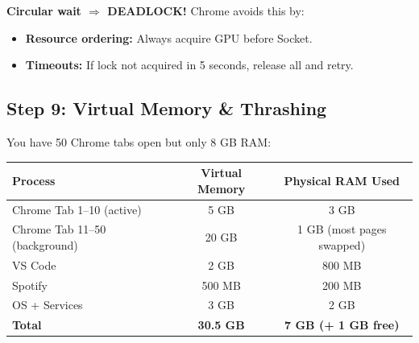 \documentclass[12pt,a4paper]{article}
\begin{document}
\begin{center}
\end{center}

\textbf{Circular wait $\Rightarrow$ DEADLOCK!} Chrome avoids this by:
\begin{itemize}[leftmargin=*]
    \item \textbf{Resource ordering:} Always acquire GPU before Socket.
    \item \textbf{Timeouts:} If lock not acquired in 5 seconds, release all and retry.
\end{itemize}

\subsection{Step 9: Virtual Memory \& Thrashing}

You have 50 Chrome tabs open but only 8 GB RAM:

\begin{center}
\begin{tabular}{@{} l c c @{}}
\toprule
\textbf{Process} & \textbf{Virtual Memory} & \textbf{Physical RAM Used} \\
\midrule
Chrome Tab 1--10 (active) & 5 GB & 3 GB \\
Chrome Tab 11--50 (background) & 20 GB & 1 GB (most pages swapped) \\
VS Code & 2 GB & 800 MB \\
Spotify & 500 MB & 200 MB \\
OS + Services & 3 GB & 2 GB \\
\midrule
\textbf{Total} & \textbf{30.5 GB} & \textbf{7 GB (+ 1 GB free)} \\
\bottomrule
\end{tabular}
\end{center}
\end{document}
